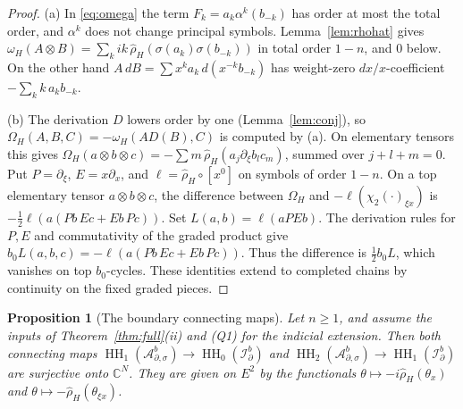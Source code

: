 \documentclass[11pt,oneside,reqno]{article}
\DeclareMathOperator{\HH}{HH}
\newcommand{\C}{\mathbb C}
\newcommand{\Idb}{\mathcal I^b_\partial}
\newcommand{\Adsb}{\mathcal A^b_{\partial,\sigma}}
\theoremstyle{plain}
\newtheorem{proposition}[theorem]{Proposition}
\theoremstyle{definition}
\theoremstyle{remark}
\begin{document}
\begin{proof}
(a) In \eqref{eq:omega} the term \(F_k=a_k\alpha^k(b_{-k})\) has order at most
the total order, and \(\alpha^k\) does not change principal symbols.
Lemma~\ref{lem:rhohat} gives
\(\omega_H(A\otimes B)=\sum_kik\,\hat\rho_H(\sigma(a_k)\sigma(b_{-k}))\)
in total order \(1-n\), and \(0\) below. On the other hand
\(A\,dB=\sum x^ka_k\,d(x^{-k}b_{-k})\) has weight-zero \(dx/x\)-coefficient
\(-\sum_kk\,a_kb_{-k}\).

(b) The derivation \(D\) lowers order by one (Lemma~\ref{lem:conj}), so \(\Omega_H(A,B,C)=
-\omega_H(AD(B),C)\) is computed by (a). On elementary tensors this gives
\(\Omega_H(a\otimes b\otimes c)=-\sum m\,\hat\rho_H(a_j\partial_\xi b_lc_m)\),
summed over \(j+l+m=0\). Put \(P=\partial_\xi\), \(E=x\partial_x\),
and \(\ell=\hat\rho_H\circ[x^0]\) on symbols of order \(1-n\).
On a top elementary tensor \(a\otimes b\otimes c\), the difference
between \(\Omega_H\) and \(-\ell(\chi_2(\cdot)_{\xi x})\) is
\(-\tfrac12\ell(a(Pb\,Ec+Eb\,Pc))\). Set \(L(a,b)=\ell(aPEb)\).
The derivation rules for \(P,E\) and commutativity of the graded
product give \(b_0L(a,b,c)=-\ell(a(Pb\,Ec+Eb\,Pc))\).
Thus the difference is \(\tfrac12 b_0L\), which vanishes on
top \(b_0\)-cycles. These identities extend to completed chains by
continuity on the fixed graded pieces.
\end{proof}

\begin{proposition}[The boundary connecting maps]
\label{prop:dict}
Let \(n\geq1\), and assume the inputs of Theorem~\ref{thm:full}(ii)
and (Q1) for the indicial extension. Then both connecting maps
\(\HH_1(\Adsb)\to\HH_0(\Idb)\) and \(\HH_2(\Adsb)\to\HH_1(\Idb)\) are
surjective onto \(\C^N\). They are given on \(E^2\) by the functionals
\(\theta\mapsto-i\hat\rho_H(\theta_x)\) and
\(\theta\mapsto-\hat\rho_H(\theta_{\xi x})\).
\end{proposition}
\end{document}
